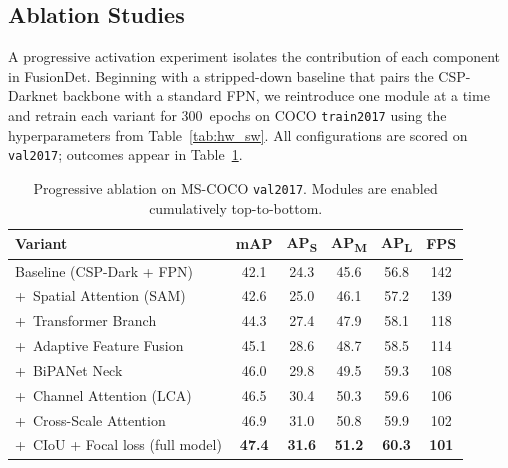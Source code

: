 
\subsection{Ablation Studies}

A progressive activation experiment isolates the contribution of each
component in FusionDet. Beginning with a stripped-down baseline that pairs
the CSP-Darknet backbone with a standard FPN, we reintroduce one module at a
time and retrain each variant for 300~epochs on COCO \texttt{train2017} using
the hyperparameters from Table~\ref{tab:hw_sw}. All configurations are scored
on \texttt{val2017}; outcomes appear in Table~\ref{tab:ablation}.

\begin{table}[!t]
\centering
\caption{Progressive ablation on MS-COCO \texttt{val2017}.
         Modules are enabled cumulatively top-to-bottom.}
\label{tab:ablation}
\renewcommand{\arraystretch}{1.18}
\setlength{\tabcolsep}{3.2pt}
\begin{tabular}{l c c c c c}
\hline\hline
\textbf{Variant} &
\textbf{mAP} &
\textbf{AP\textsubscript{S}} &
\textbf{AP\textsubscript{M}} &
\textbf{AP\textsubscript{L}} &
\textbf{FPS} \\
\hline
Baseline (CSP-Dark + FPN)           & 42.1 & 24.3 & 45.6 & 56.8 & 142 \\
+~Spatial Attention (SAM)           & 42.6 & 25.0 & 46.1 & 57.2 & 139 \\
+~Transformer Branch                & 44.3 & 27.4 & 47.9 & 58.1 & 118 \\
+~Adaptive Feature Fusion           & 45.1 & 28.6 & 48.7 & 58.5 & 114 \\
+~BiPANet Neck                      & 46.0 & 29.8 & 49.5 & 59.3 & 108 \\
+~Channel Attention (LCA)           & 46.5 & 30.4 & 50.3 & 59.6 & 106 \\
+~Cross-Scale Attention             & 46.9 & 31.0 & 50.8 & 59.9 & 102 \\
+~CIoU + Focal loss (full model)    & \textbf{47.4} & \textbf{31.6}
    & \textbf{51.2} & \textbf{60.3} & \textbf{101} \\
\hline\hline
\end{tabular}
\end{table}

